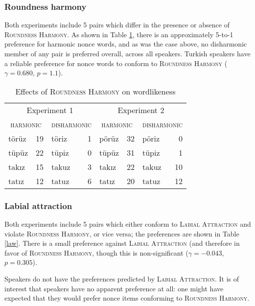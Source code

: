 \subsubsection{Roundness harmony}

Both experiments include 5 pairs which differ in the presence or absence of \textsc{Roundness Harmony}. 
As shown in Table \ref{rhw}, there is an approximately 5-to-1 preference for harmonic nonce words, and as was the case above, no disharmonic member of any pair is preferred overall, across all speakers. 
Turkish speakers have a reliable preference for nonce words to conform to \textsc{Roundness Harmony} ($\gamma = 0.680$, $p = 1.1$).

\begin{table}[t]
\center
\begin{tabular}{lrlr|lrlr}
\toprule
\multicolumn{4}{c|}{Experiment 1} & \multicolumn{4}{c}{Experiment 2} \\
\multicolumn{2}{c}{\textsc{harmonic}} & \multicolumn{2}{c|}{\textsc{disharmonic}} & \multicolumn{2}{c}{\textsc{harmonic}} & \multicolumn{2}{c}{\textsc{disharmonic}} \\
\midrule
{törüz} & 19 & {töriz} & 1 & {pörüz} & 32 & {pöriz} & 0  \\
{tüpüz} & 22 & {tüpiz} & 0 & {tüpüz} & 31 & {tüpiz} & 1  \\
{takız} & 15 & {takuz} & 3 & {takız} & 22 & {takuz} & 10 \\
{tatız} & 12 & {tatuz} & 6 & {tatız} & 20 & {tatuz} & 12 \\
\bottomrule
\end{tabular}
\caption{Effects of \textsc{Roundness Harmony} on wordlikeness \citep[from][]{Zimmer1969}}
\label{rhw}
\end{table}

\subsubsection{Labial attraction}

Both experiments include 5 pairs which either conform to \textsc{Labial Attraction} and violate \textsc{Roundness Harmony}, or vice versa; the preferences are shown in Table \ref{law}. There is a small preference against \textsc{Labial Attraction} (and therefore in favor of \textsc{Roundness Harmony}, though this is non-significant ($\gamma = -0.043$, $p = 0.305$).

Speakers do not have the preferences predicted by \textsc{Labial Attraction}. 
It is of interest that speakers have no apparent preference at all: one might have expected that they would prefer nonce items conforming to \textsc{Roundness Harmony}.

